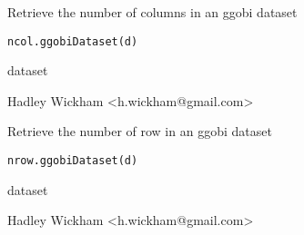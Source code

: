 \documentclass{article}
\begin{document}
\begin{Description}\relax
Retrieve the number of columns in an ggobi dataset
\end{Description}
\begin{Usage}
\begin{verbatim}ncol.ggobiDataset(d)\end{verbatim}
\end{Usage}
\begin{Arguments}
\begin{ldescription}
\item[\code{d}] dataset
\end{ldescription}
\end{Arguments}
\begin{Details}\relax
\end{Details}
\begin{Author}\relax
Hadley Wickham <h.wickham@gmail.com>
\end{Author}
\begin{Examples}
\begin{ExampleCode}\end{ExampleCode}
\end{Examples}

\begin{Description}\relax
Retrieve the number of row in an ggobi dataset
\end{Description}
\begin{Usage}
\begin{verbatim}nrow.ggobiDataset(d)\end{verbatim}
\end{Usage}
\begin{Arguments}
\begin{ldescription}
\item[\code{d}] dataset
\end{ldescription}
\end{Arguments}
\begin{Details}\relax
\end{Details}
\begin{Author}\relax
Hadley Wickham <h.wickham@gmail.com>
\end{Author}
\begin{Examples}
\begin{ExampleCode}\end{ExampleCode}
\end{Examples}
\end{document}
